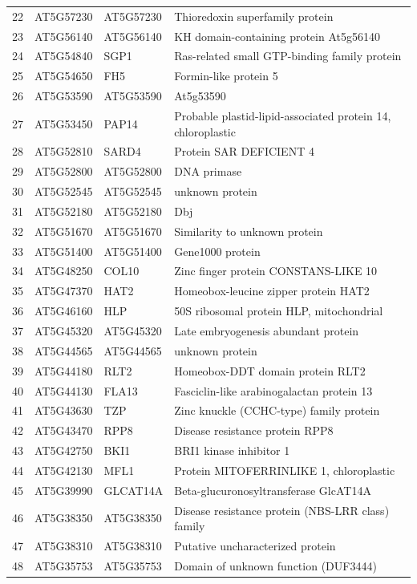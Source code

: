 \documentclass[11pt]{article}
\begin{document}
\begin{center}
\begin{tabular}{rlll}
22 & AT5G57230 & AT5G57230 & Thioredoxin superfamily protein\\
23 & AT5G56140 & AT5G56140 & KH domain-containing protein At5g56140\\
24 & AT5G54840 & SGP1 & Ras-related small GTP-binding family protein\\
25 & AT5G54650 & FH5 & Formin-like protein 5\\
26 & AT5G53590 & AT5G53590 & At5g53590\\
27 & AT5G53450 & PAP14 & Probable plastid-lipid-associated protein 14, chloroplastic\\
28 & AT5G52810 & SARD4 & Protein SAR DEFICIENT 4\\
29 & AT5G52800 & AT5G52800 & DNA primase\\
30 & AT5G52545 & AT5G52545 & unknown protein\\
31 & AT5G52180 & AT5G52180 & Dbj\\
32 & AT5G51670 & AT5G51670 & Similarity to unknown protein\\
33 & AT5G51400 & AT5G51400 & Gene1000 protein\\
34 & AT5G48250 & COL10 & Zinc finger protein CONSTANS-LIKE 10\\
35 & AT5G47370 & HAT2 & Homeobox-leucine zipper protein HAT2\\
36 & AT5G46160 & HLP & 50S ribosomal protein HLP, mitochondrial\\
37 & AT5G45320 & AT5G45320 & Late embryogenesis abundant protein\\
38 & AT5G44565 & AT5G44565 & unknown protein\\
39 & AT5G44180 & RLT2 & Homeobox-DDT domain protein RLT2\\
40 & AT5G44130 & FLA13 & Fasciclin-like arabinogalactan protein 13\\
41 & AT5G43630 & TZP & Zinc knuckle (CCHC-type) family protein\\
42 & AT5G43470 & RPP8 & Disease resistance protein RPP8\\
43 & AT5G42750 & BKI1 & BRI1 kinase inhibitor 1\\
44 & AT5G42130 & MFL1 & Protein MITOFERRINLIKE 1, chloroplastic\\
45 & AT5G39990 & GLCAT14A & Beta-glucuronosyltransferase GlcAT14A\\
46 & AT5G38350 & AT5G38350 & Disease resistance protein (NBS-LRR class) family\\
47 & AT5G38310 & AT5G38310 & Putative uncharacterized protein\\
48 & AT5G35753 & AT5G35753 & Domain of unknown function (DUF3444)\\

\end{tabular}
\end{center}
\end{document}
